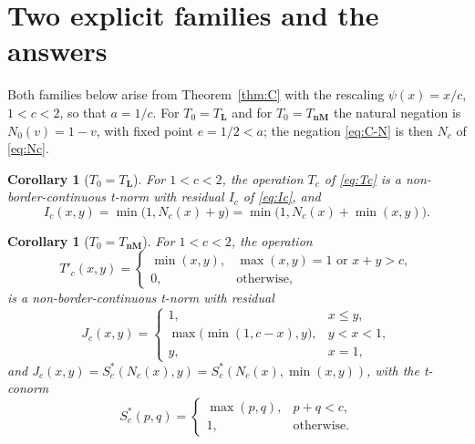 \documentclass[11pt]{amsart}
\numberwithin{equation}{section}
\newtheorem{corollary}[theorem]{Corollary}
\theoremstyle{definition}
\theoremstyle{remark}
\newcommand{\TL}{T_{\mathbf{L}}}
\newcommand{\TnM}{T_{\mathbf{nM}}}
\begin{document}
\section{Two explicit families and the answers}\label{sec:consequences}

Both families below arise from Theorem~\ref{thm:C} with the rescaling
$\psi(x)=x/c$, $1<c<2$, so that $a=1/c$. For $T_0=\TL$ and for $T_0=\TnM$ the
natural negation is $N_0(v)=1-v$, with fixed point $e=1/2<a$; the negation
\eqref{eq:C-N} is then $N_c$ of \eqref{eq:Nc}.

\begin{corollary}[{$T_0=\TL$}]\label{cor:A}
For $1<c<2$, the operation $T_c$ of \eqref{eq:Tc} is a non-border-continuous
t-norm with residual $I_c$ of \eqref{eq:Ic}, and
\[
  I_c(x,y)=\min\bigl(1,N_c(x)+y\bigr)=\min\bigl(1,N_c(x)+\min(x,y)\bigr).
\]
\end{corollary}

\begin{corollary}[{$T_0=\TnM$}]\label{cor:B}
For $1<c<2$, the operation
\begin{equation}\label{eq:Tpc}
  T'_c(x,y)=\begin{cases} \min(x,y), & \max(x,y)=1 \text{ or } x+y>c,\\
                          0, & \text{otherwise},\end{cases}
\end{equation}
is a non-border-continuous t-norm with residual
\begin{equation}\label{eq:Jc}
  J_c(x,y)=\begin{cases} 1, & x\le y,\\
                         \max\bigl(\min(1,c-x),y\bigr), & y<x<1,\\
                         y, & x=1,\end{cases}
\end{equation}
and $J_c(x,y)=S^*_c(N_c(x),y)=S^*_c(N_c(x),\min(x,y))$, with the t-conorm
\begin{equation}\label{eq:Sstar}
  S^*_c(p,q)=\begin{cases} \max(p,q), & p+q<c,\\ 1, & \text{otherwise}.\end{cases}
\end{equation}
\end{corollary}
\end{document}
